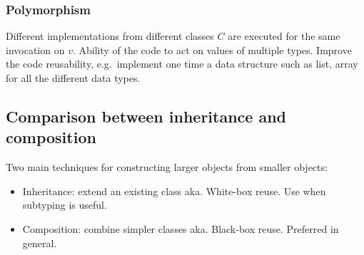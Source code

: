 \subsubsection{Polymorphism}
Different implementations from different classes $C$ are executed for the same invocation on $v$.
Ability of the code to act on values of multiple types.\newline
Improve the code reusability, e.g.\ implement one time a data structure such as list, array for
all the different data types.

\subsection{Comparison between inheritance and composition}

Two main techniques for constructing larger objects from smaller objects:

\begin{itemize}
    \item Inheritance: extend an existing class aka. White-box reuse. Use when subtyping is
useful.
    \item Composition: combine simpler classes aka. Black-box reuse. Preferred in general.
\end{itemize}

